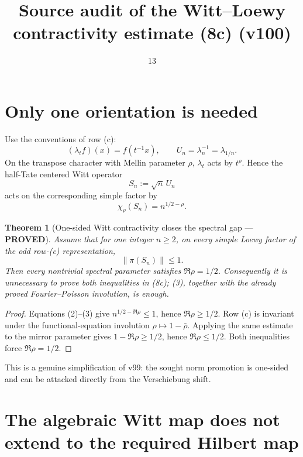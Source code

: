 \documentclass[11pt]{article}
\title{Source audit of the Witt--Loewy contractivity estimate (8c) (v100)}
\date{13}
\newcommand{\PROVED}{\textcolor{green!40!black}{\textbf{PROVED}}}
\newtheorem{theorem}{Theorem}
\begin{document}
\maketitle

\section{Only one orientation is needed}

Use the conventions of row (c):
\[
 (\lambda_t f)(x)=f(t^{-1}x),\qquad
 U_n=\lambda_n^{-1}=\lambda_{1/n}.
\]
On the transpose character with Mellin parameter $\rho$, $\lambda_t$ acts
by $t^\rho$.  Hence the half-Tate centered Witt operator
\begin{equation}
                    S_n:=\sqrt n\,U_n                \tag{1}
\end{equation}
acts on the corresponding simple factor by
\begin{equation}
                    \chi_\rho(S_n)=n^{1/2-\rho}.     \tag{2}
\end{equation}

\begin{theorem}[One-sided Witt contractivity closes the spectral gap ---
\PROVED]
Assume that for one integer $n\ge2$, on every simple Loewy factor of the
odd row-(c) representation,
\begin{equation}
                         \|\pi(S_n)\|\le1.           \tag{3}
\end{equation}
Then every nontrivial spectral parameter satisfies
$\Re\rho=1/2$.  Consequently it is unnecessary to prove both inequalities
in (8c); (3), together with the already proved Fourier--Poisson involution,
is enough.
\end{theorem}

\begin{proof}
Equations (2)--(3) give
$n^{1/2-\Re\rho}\le1$, hence $\Re\rho\ge1/2$.  Row (c) is invariant under
the functional-equation involution $\rho\mapsto1-\bar\rho$.  Applying the
same estimate to the mirror parameter gives
$1-\Re\rho\ge1/2$, hence $\Re\rho\le1/2$.  Both inequalities force
$\Re\rho=1/2$.
\end{proof}

This is a genuine simplification of v99: the sought norm promotion is
one-sided and can be attacked directly from the Verschiebung shift.

\section{The algebraic Witt map does not extend to the required Hilbert map}
\end{document}
